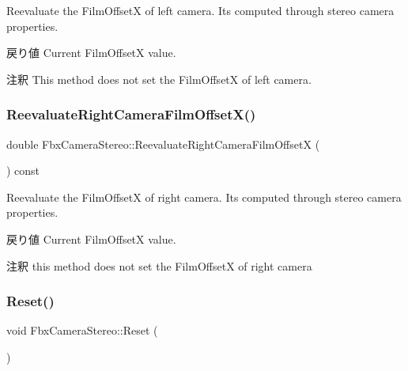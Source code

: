 Reevaluate the Film\+OffsetX of left camera. It\textquotesingle{}s computed through stereo camera properties. \begin{DoxyReturn}{戻り値}
Current Film\+OffsetX value. 
\end{DoxyReturn}
\begin{DoxyRemark}{注釈}
This method does not set the Film\+OffsetX of left camera. 
\end{DoxyRemark}
\mbox{\label{class_fbx_camera_stereo_a63526f13544a343e4447d4567a88bf9d}} 
\subsubsection{\texorpdfstring{Reevaluate\+Right\+Camera\+Film\+Offset\+X()}{ReevaluateRightCameraFilmOffsetX()}}
{\footnotesize\ttfamily double Fbx\+Camera\+Stereo\+::\+Reevaluate\+Right\+Camera\+Film\+OffsetX (\begin{DoxyParamCaption}{ }\end{DoxyParamCaption}) const}

Reevaluate the Film\+OffsetX of right camera. It\textquotesingle{}s computed through stereo camera properties. \begin{DoxyReturn}{戻り値}
Current Film\+OffsetX value. 
\end{DoxyReturn}
\begin{DoxyRemark}{注釈}
this method does not set the Film\+OffsetX of right camera 
\end{DoxyRemark}
\mbox{\label{class_fbx_camera_stereo_a5c693025d4b4d25ea05bec61f2c25cd8}} 
\subsubsection{\texorpdfstring{Reset()}{Reset()}}
{\footnotesize\ttfamily void Fbx\+Camera\+Stereo\+::\+Reset (\begin{DoxyParamCaption}{ }\end{DoxyParamCaption})}



